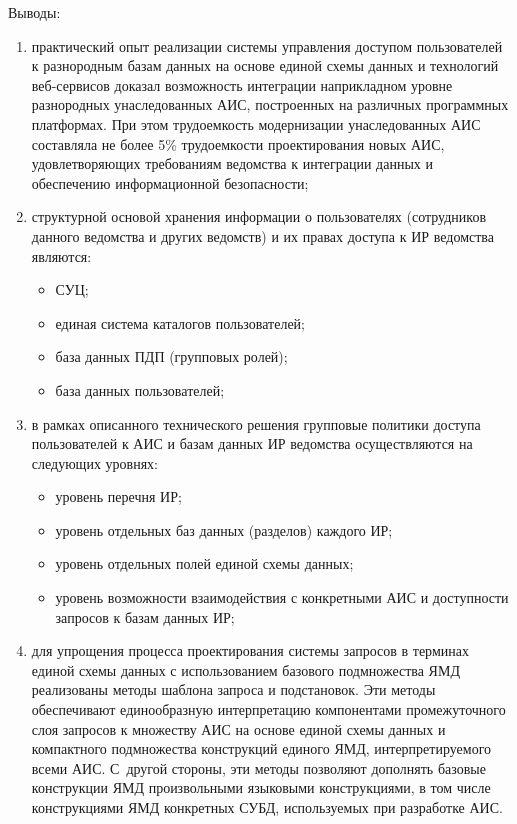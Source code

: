 \begin{multicols}{2}
      Выводы: 
      \begin{enumerate}[(1)]
\item практический опыт реализации системы управ\-ле\-ния доступом пользователей к 
разнородным базам данных на основе единой схемы данных и технологий веб-сер\-ви\-сов 
доказал возможность интеграции на\linebreak прикладном уровне разнородных унаследованных АИС, 
постро\-енных на различных прог\-рам\-мных платформах. При этом трудоемкость модернизации 
унаследованных АИС составляла не более 5\% трудоемкости проектирования новых АИС, 
удовлетворяющих требованиям ведомства к интеграции данных и обеспечению 
информационной безопасности;
\item структурной основой хранения информации о пользователях (сотрудников данного 
ведомства и других ведомств) и их правах доступа к ИР ведомства 
являются:
\begin{itemize}
\item СУЦ;
\item единая система каталогов пользователей;
\item база данных ПДП (групповых ролей);
\item база данных пользователей;
\end{itemize}
\item в рамках описанного технического решения групповые политики доступа пользователей 
к АИС и базам данных ИР ведомства осуществляются на следующих 
уровнях:
\begin{itemize}
\item уровень перечня ИР;
\item уровень отдельных баз данных (разделов) каждого ИР;
\item уровень отдельных полей единой схемы данных;
\item уровень возможности взаимодействия с конкретными АИС и доступности запросов к 
базам данных ИР;
\end{itemize}
\item для упрощения процесса проектирования сис\-те\-мы запросов в терминах единой схемы 
данных с использованием базового подмножества ЯМД реализованы методы шаблона\linebreak
 запроса 
и подстановок. Эти методы обеспечивают единообразную интерпретацию компонентами 
промежуточного слоя запросов к множеству АИС на основе единой схемы данных и 
компактного подмножества конструкций единого ЯМД, интерпретируемого всеми АИС. 
С~другой стороны, эти методы позволяют дополнять базовые конструкции ЯМД произвольными 
языковыми конструкциями, в том числе конструкциями ЯМД конкретных СУБД, 
используемых при разработке АИС.
\end{enumerate}


\end{multicols}

